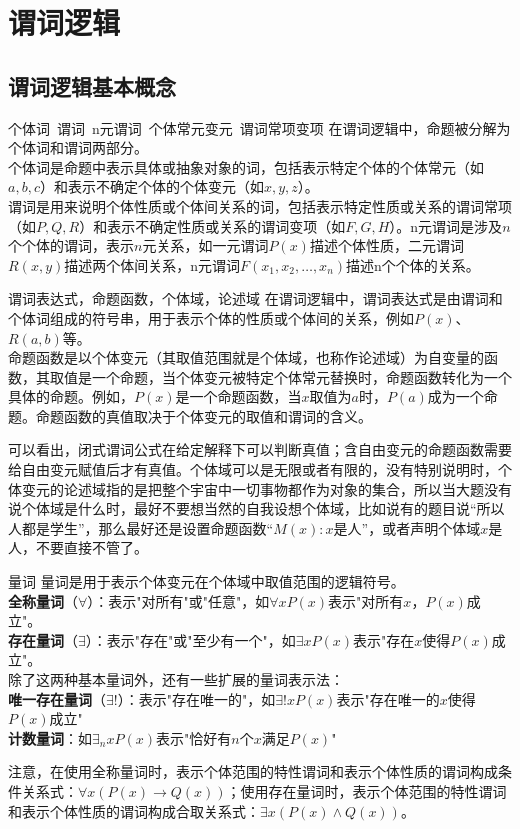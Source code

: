 \documentclass[lang=cn,11pt]{elegantbook}
\begin{document}
\chapter{谓词逻辑}
\section{谓词逻辑基本概念}
\begin{definition}{个体词~谓词~n元谓词~个体常元变元~谓词常项变项}
在谓词逻辑中，命题被分解为个体词和谓词两部分。\\
个体词是命题中表示具体或抽象对象的词，包括表示特定个体的个体常元（如$a, b, c$）和表示不确定个体的个体变元（如$x, y, z$）。\\
谓词是用来说明个体性质或个体间关系的词，包括表示特定性质或关系的谓词常项（如$P, Q, R$）和表示不确定性质或关系的谓词变项（如$F, G, H$）。n元谓词是涉及$n$个个体的谓词，表示$n$元关系，如一元谓词$P(x)$描述个体性质，二元谓词$R(x,y)$描述两个体间关系，n元谓词$F(x_1,x_2,\ldots,x_n)$描述n个个体的关系。
\end{definition}
\begin{definition}{谓词表达式，命题函数，个体域，论述域}
在谓词逻辑中，谓词表达式是由谓词和个体词组成的符号串，用于表示个体的性质或个体间的关系，例如$P(x)$、$R(a, b)$等。\\
命题函数是以个体变元（其取值范围就是个体域，也称作论述域）为自变量的函数，其取值是一个命题，当个体变元被特定个体常元替换时，命题函数转化为一个具体的命题。例如，$P(x)$是一个命题函数，当$x$取值为$a$时，$P(a)$成为一个命题。命题函数的真值取决于个体变元的取值和谓词的含义。
\end{definition}
可以看出，闭式谓词公式在给定解释下可以判断真值；含自由变元的命题函数需要给自由变元赋值后才有真值。个体域可以是无限或者有限的，没有特别说明时，个体变元的论述域指的是把整个宇宙中一切事物都作为对象的集合，所以当大题没有说个体域是什么时，最好不要想当然的自我设想个体域，比如说有的题目说“所以人都是学生”，那么最好还是设置命题函数“$M(x):x$是人”，或者声明个体域$x$是人，不要直接不管了。
\begin{definition}{量词}
量词是用于表示个体变元在个体域中取值范围的逻辑符号。\\
\textbf{全称量词}（$\forall$）：表示"对所有"或"任意"，如$\forall x P(x)$表示"对所有$x$，$P(x)$成立"。\\
\textbf{存在量词}（$\exists$）：表示"存在"或"至少有一个"，如$\exists x P(x)$表示"存在$x$使得$P(x)$成立"。\\
除了这两种基本量词外，还有一些扩展的量词表示法：\\
\textbf{唯一存在量词}（$\exists!$）：表示"存在唯一的"，如$\exists! x P(x)$表示"存在唯一的$x$使得$P(x)$成立"\\
\textbf{计数量词}：如$\exists_n x P(x)$表示"恰好有$n$个$x$满足$P(x)$"
\end{definition}
注意，在使用全称量词时，表示个体范围的特性谓词和表示个体性质的谓词构成条件关系式：$\forall x (P(x) \rightarrow Q(x))$；使用存在量词时，表示个体范围的特性谓词和表示个体性质的谓词构成合取关系式：$\exists x (P(x) \land Q(x))$。
\end{document}
